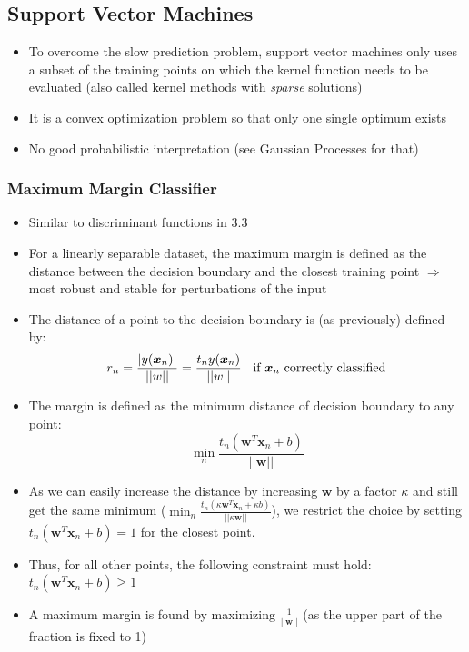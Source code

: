 \subsection{Support Vector Machines}
\begin{itemize}
	\item To overcome the slow prediction problem, support vector machines only uses a subset of the training points on which the kernel function needs to be evaluated (also called kernel methods with \textit{sparse} solutions)
	\item It is a convex optimization problem so that only one single optimum exists
	\item No good probabilistic interpretation (see Gaussian Processes for that)
\end{itemize}
\subsubsection{Maximum Margin Classifier}
\begin{itemize}
	\item Similar to discriminant functions in 3.3
	\item For a linearly separable dataset, the maximum margin is defined as the distance between the decision boundary and the closest training point $\Rightarrow$ most robust and stable for perturbations of the input
	\item The distance of a point to the decision boundary is (as previously) defined by:
	$$r_n = \frac{|y(\bm{x}_n)|}{||w||} = \frac{t_ny(\bm{x}_n)}{||w||}\text{\hspace{2mm} if } \bm{x}_n \text{ correctly classified}$$ 
	\item The margin is defined as the minimum distance of decision boundary to any point:
	$$\min_n \frac{t_n \left(\bm{w}^T\bm{x}_n + b\right)}{||\bm{w}||} $$
	\item As we can easily increase the distance by increasing $\bm{w}$ by a factor $\kappa$ and still get the same minimum ($\min_n \frac{t_n \left(\kappa \bm{w}^T\bm{x}_n + \kappa b\right)}{||\kappa \bm{w}||}$), we restrict the choice by setting $t_n \left(\bm{w}^T\bm{x}_n + b\right) = 1$ for the closest point. 
	\item Thus, for all other points, the following constraint must hold: $t_n \left(\bm{w}^T\bm{x}_n + b\right) \geq 1$
	\item A maximum margin is found by maximizing $\frac{1}{||\bm{w}||}$ (as the upper part of the fraction is fixed to 1)
\end{itemize}
